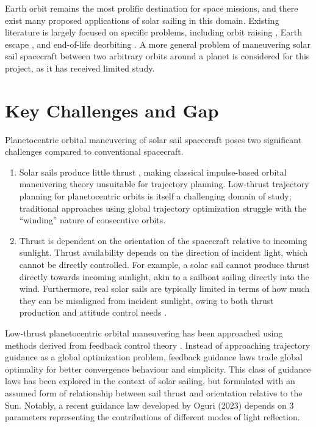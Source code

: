 Earth orbit remains the most prolific destination for space missions, and there exist many proposed applications of solar sailing in this domain. Existing literature is largely focused on specific problems, including orbit raising \cite{fieseler1998method}, Earth escape \cite{coverstone2003technique}, and end-of-life deorbiting \cite{lappas2011deorbitsail}. A more general problem of maneuvering solar sail spacecraft between two arbitrary orbits around a planet is considered for this project, as it has received limited study.

\section{Key Challenges and Gap}
Planetocentric orbital maneuvering of solar sail spacecraft poses two significant challenges compared to conventional spacecraft.
\begin{enumerate}
  \item Solar sails produce little thrust \cite{mcinnes}, making classical impulse-based orbital maneuvering theory unsuitable for trajectory planning. Low-thrust trajectory planning for planetocentric orbits is itself a challenging domain of study; traditional approaches using global trajectory optimization struggle with the ``winding'' nature of consecutive orbits.
  \item Thrust is dependent on the orientation of the spacecraft relative to incoming sunlight. Thrust availability depends on the direction of incident light, which cannot be directly controlled. For example, a solar sail cannot produce thrust directly towards incoming sunlight, akin to a sailboat sailing directly into the wind. Furthermore, real solar sails are typically limited in terms of how much they can be misaligned from incident sunlight, owing to both thrust production and attitude control needs \cite{mcinnes}.
\end{enumerate}

Low-thrust planetocentric orbital maneuvering has been approached using methods derived from feedback control theory \cite{ilgen1994low, petropoulos2004low, vargaperez2016, sanjeev2023}. Instead of approaching trajectory guidance as a global optimization problem, feedback guidance laws trade global optimality for better convergence behaviour and simplicity. This class of guidance laws has been explored in the context of solar sailing, but formulated with an assumed form of relationship between sail thrust and orientation relative to the Sun. Notably, a recent guidance law developed by Oguri (2023) \cite{oguri2023solar} depends on 3 parameters representing the contributions of different modes of light reflection.

